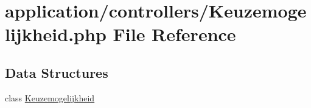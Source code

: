 \hypertarget{_keuzemogelijkheid_8php}{}\section{application/controllers/\+Keuzemogelijkheid.php File Reference}
\label{_keuzemogelijkheid_8php}
\subsection*{Data Structures}
\begin{DoxyCompactItemize}
\item 
class \mbox{\hyperlink{class_keuzemogelijkheid}{Keuzemogelijkheid}}
\end{DoxyCompactItemize}

